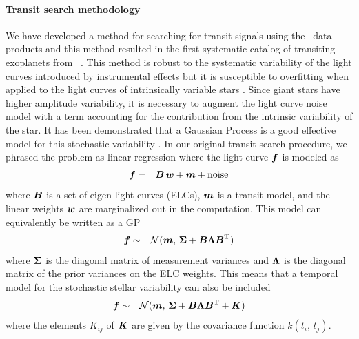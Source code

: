 \documentclass[letterpaper,12pt,preprint]{hack_aastex}
\begin{document}

\paragraph{Transit search methodology}

We have developed a method for searching for transit signals using the \KT\
data products and this method resulted in the first systematic catalog of
transiting exoplanets from \KT\ \citep{Foreman-Mackey:2015}.
This method is robust to the systematic variability of the light curves
introduced by instrumental effects but it is susceptible to overfitting when
applied to the light curves of intrinsically variable stars
\citep{Montet:2015}.
Since giant stars have higher amplitude variability, it is necessary to
augment the light curve noise model with a term accounting for the
contribution from the intrinsic variability of the star.
It has been demonstrated that a Gaussian Process
\citep[GP;][]{Rasmussen:2006, Ambikasaran:2014} is a good effective
model for this stochastic variability \citep{Barclay:2015}.
In our original transit search procedure, we phrased the problem as linear
regression \citep{Foreman-Mackey:2015} where the light curve ${{\boldsymbol{f}}}$ is
modeled as
\begin{eqnarray}
{\ensuremath{{\boldsymbol{f}}}} &=& {{\boldsymbol{B}}}\,{{\boldsymbol{w}}} + {{\boldsymbol{m}}} + \mathrm{noise}
\end{eqnarray}
where ${{\boldsymbol{B}}}$ is a set of eigen light curves (ELCs), ${{\boldsymbol{m}}}$ is a
transit model, and the linear weights ${{\boldsymbol{w}}}$ are marginalized out in the
computation.
This model can equivalently be written as a GP \citep{Rasmussen:2006}
\begin{eqnarray}
{\ensuremath{{\boldsymbol{f}}}} &\sim& \mathcal{N} ({{\boldsymbol{m}}},\,
{{\boldsymbol{\Sigma}}} + {{\boldsymbol{B}}}{{\boldsymbol{\Lambda}}}{{\boldsymbol{B}}}^\mathrm{T})
\end{eqnarray}
where ${{\boldsymbol{\Sigma}}}$ is the diagonal matrix of measurement variances and
${{\boldsymbol{\Lambda}}}$ is the diagonal matrix of the prior variances on the ELC
weights.
This means that a temporal model for the stochastic stellar variability can
also be included
\begin{eqnarray}
{\ensuremath{{\boldsymbol{f}}}} &\sim& \mathcal{N} ({{\boldsymbol{m}}},\,
{{\boldsymbol{\Sigma}}} + {{\boldsymbol{B}}}{{\boldsymbol{\Lambda}}}{{\boldsymbol{B}}}^\mathrm{T} + {{\boldsymbol{K}}})
\end{eqnarray}
where the elements $K_{ij}$ of ${{\boldsymbol{K}}}$ are given by the covariance function
$k(t_i,\,t_j)$.
\end{document}
